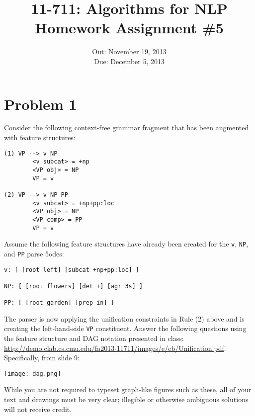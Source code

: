 \documentclass[11pt,letterpaper]{article}
\begin{document}
\title{{\bf 11-711: Algorithms for NLP}\\
       Homework Assignment \#5
}

\author{}
\date{Out: November 19, 2013\\
      Due: December 5, 2013}
\maketitle

\section*{Problem 1}

Consider the following context-free grammar fragment that has been augmented with feature structures:

\begin{verbatim}
(1) VP --> v NP
        <v subcat> = +np
        <VP obj> = NP
        VP = v

(2) VP --> v NP PP
        <v subcat> = +np+pp:loc
        <VP obj> = NP
        <VP comp> = PP
        VP = v
\end{verbatim}

Assume the following feature structures have already been created for the {\tt v}, {\tt NP}, and {\tt PP} parse 5odes:

\begin{verbatim}
v: [ [root left] [subcat +np+pp:loc] ]

NP: [ [root flowers] [det +] [agr 3s] ]

PP: [ [root garden] [prep in] ]
\end{verbatim}

The parser is now applying the unification constraints in Rule (2) above and is creating the left-hand-side {\tt VP} constituent.  Answer the following questions using the feature structure and DAG notation presented in class: \url{http://demo.clab.cs.cmu.edu/fa2013-11711/images/e/eb/Unification.pdf}.  Specifically, from slide 9:

\centerline{\texttt{[image: dag.png]}}

While you are not required to typeset graph-like figures such as these, all of your text and drawings must be very clear; illegible or otherwise ambiguous solutions will not receive credit.
\end{document}
